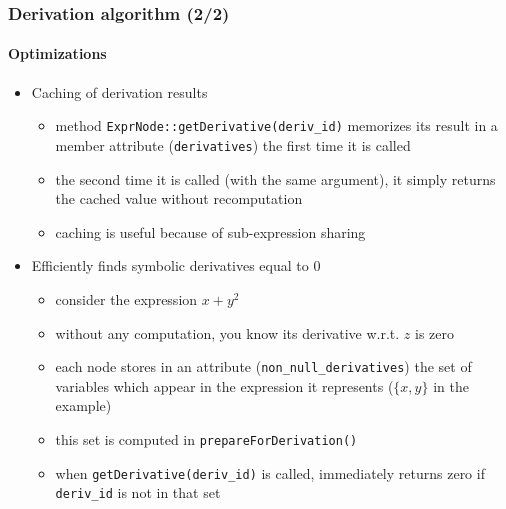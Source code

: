 \documentclass{beamer}
\begin{document}
\begin{frame}
  \frametitle{Derivation algorithm (2/2)}
  \framesubtitle{Optimizations}
  \begin{itemize}
  \item Caching of derivation results
    \begin{itemize}
    \item method \texttt{ExprNode::getDerivative(deriv\_id)} memorizes its result in a member attribute (\texttt{derivatives}) the first time it is called
    \item the second time it is called (with the same argument), it simply returns the cached value without recomputation
    \item caching is useful because of sub-expression sharing
    \end{itemize}
  \item Efficiently finds symbolic derivatives equal to $0$
    \begin{itemize}
    \item consider the expression $x+y^2$
    \item without any computation, you know its derivative w.r.t. $z$ is zero
    \item each node stores in an attribute (\texttt{non\_null\_derivatives}) the set of variables which appear in the expression it represents ($\{x,y\}$ in the example)
    \item this set is computed in \texttt{prepareForDerivation()}
    \item when \texttt{getDerivative(deriv\_id)} is called, immediately returns zero if \texttt{deriv\_id} is not in that set
    \end{itemize}
  \end{itemize}
\end{frame}
\end{document}
